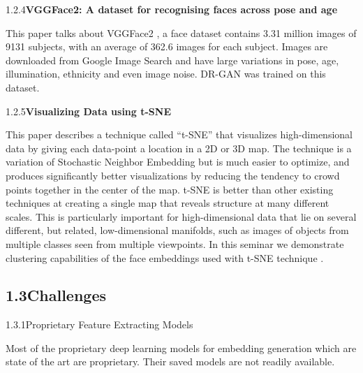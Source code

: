 \documentclass[12pt]{article}
\renewcommand{\_}{\kern-1.5pt\textunderscore\kern-1.5pt}
\begin{document}
\vspace{\baselineskip}
1.2.4\tab \textbf{VGGFace2: A dataset for recognising faces across pose and age}\par
This paper talks about VGGFace2 \cite{cao2018vggface2}, a face dataset contains 3.31 million images of 9131 subjects, with an average of 362.6 images for each subject. Images are downloaded from Google Image Search and have large variations in pose, age, illumination, ethnicity and even image noise. DR-GAN  \cite{tran2017disentangled}  was trained on this dataset.\par

\vspace{\baselineskip}
1.2.5\tab \textbf{Visualizing Data using t-SNE}\par
This paper describes a technique called “t-SNE” \cite{maaten2008visualizing} that visualizes high-dimensional data by giving each data-point a location in a 2D or 3D map. The technique is a variation of Stochastic Neighbor Embedding but is much easier to optimize, and produces significantly better visualizations by reducing the tendency to crowd points together in the center of the map. t-SNE  \cite{maaten2008visualizing}  is better than other existing techniques at creating a single map that reveals structure at many different scales. This is particularly important for high-dimensional data that lie on several different, but related, low-dimensional manifolds, such as images of objects from multiple classes seen from multiple viewpoints. In this seminar we demonstrate clustering capabilities of the face embeddings used with t-SNE technique  \cite{maaten2008visualizing}  .\par

\subsection*{1.3\hspace*{10pt}Challenges}
\begin{justify}
1.3.1\tab Proprietary Feature Extracting Models
\end{justify}\par

Most of the proprietary deep learning models for embedding generation which are state of the art are proprietary. Their saved models are not readily available.\par
\end{document}
